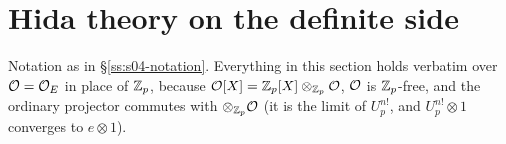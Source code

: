 \section{Hida theory on the definite side}

Notation as in \S\ref{ss:s04-notation}. Everything in this section holds verbatim over $\mathcal{O}=\mathcal{O}_E$ in place of $\mathbb{Z}_p$, because
$\mathcal{O}[X]=\mathbb{Z}_p[X]\otimes_{\mathbb{Z}_p}\mathcal{O}$, $\mathcal{O}$ is $\mathbb{Z}_p$-free, and the ordinary projector commutes with $\otimes_{\mathbb{Z}_p}\mathcal{O}$ (it is the limit of
$U_p^{n!}$, and $U_p^{n!}\otimes1$ converges to $e\otimes1$).

